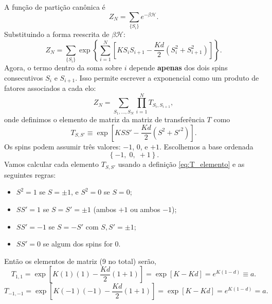 \documentclass[11pt,a4paper]{article}
\begin{document}
A função de partição canônica é
%
\begin{equation}
    Z_N = \sum_{\{S_i\}} e^{-\beta \mathcal H}.
\end{equation}
%
Substituindo a forma reescrita de \(\beta \mathcal H\):
%
\begin{equation}
    Z_N = \sum_{\{S_i\}} \exp\left\{ \sum_{i=1}^N \left[ K S_i S_{i+1} - \frac{Kd}{2} \left( S_i^2 + S_{i+1}^2 \right) \right] \right\}.
    \label{eq:Z_fatorada}
\end{equation}
%
Agora, o termo dentro da soma sobre \(i\) depende \textbf{apenas} dos dois spins consecutivos \(S_i\) e \(S_{i+1}\). Isso permite escrever a exponencial como um produto de fatores associados a cada elo:
%
\begin{equation}
    Z_N = \sum_{S_1, \dots, S_N} \prod_{i=1}^N T_{S_i, S_{i+1}},
\end{equation}
%
onde definimos o elemento de matriz da matriz de transferência \(T\) como
%
\begin{equation}
    T_{S, S'} \equiv \exp\left[ K S S' - \frac{Kd}{2} \left( S^2 + S'^2 \right) \right].
    \label{eq:T_elemento}
\end{equation}
%
Os spins podem assumir três valores: \(-1\), \(0\), e \(+1\). Escolhemos a base ordenada
%
\begin{equation}
    \left\{ -1,\; 0,\; +1 \right\}.
\end{equation}
%
Vamos calcular cada elemento \(T_{S,S'}\) usando a definição \eqref{eq:T_elemento} e as seguintes regras:
%
\begin{itemize}
    \item \(S^2 = 1\) se \(S = \pm 1\), e \(S^2 = 0\) se \(S = 0\);
    \item \(S S' = 1\) se \(S = S' = \pm 1\) (ambos \(+1\) ou ambos \(-1\));
    \item \(S S' = -1\) se \(S = -S'\) com \(S,S' = \pm 1\);
    \item \(S S' = 0\) se algum dos spins for \(0\).
\end{itemize}
%
Então os elementos de matriz (9 no total) serão,
%
\begin{equation}
    T_{1,1} = \exp\left[ K (1)(1) - \frac{Kd}{2} (1 + 1) \right]
    = \exp\left[ K - Kd \right]
    = e^{K(1-d)} \equiv a.
\end{equation}
%
\begin{equation}
    T_{-1,-1} = \exp\left[ K (-1)(-1) - \frac{Kd}{2} (1 + 1) \right]
    = \exp\left[ K - Kd \right]
    = e^{K(1-d)} = a.
\end{equation}
\end{document}
